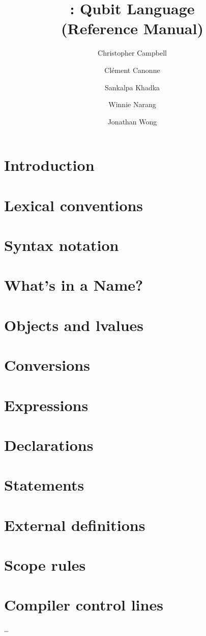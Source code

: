 \documentclass[11pt]{report}
\title{\QL: Qubit Language\\ \Large(Reference Manual)}
\author{
  Christopher Campbell
  \and Cl\'ement Canonne
  \and Sankalpa Khadka
  \and Winnie Narang
  \and Jonathan Wong
}
\begin{document}
\maketitle
\tableofcontents

\chapter{Introduction}
\chapter{Lexical conventions}

\chapter{Syntax notation}
\chapter{What's in a Name?}
\chapter{Objects and lvalues}
\chapter{Conversions}
\chapter{Expressions}

\chapter{Declarations}
\chapter{Statements}
\chapter{External definitions}
\chapter{Scope rules}
\chapter{Compiler control lines}
\dots
\end{document}
